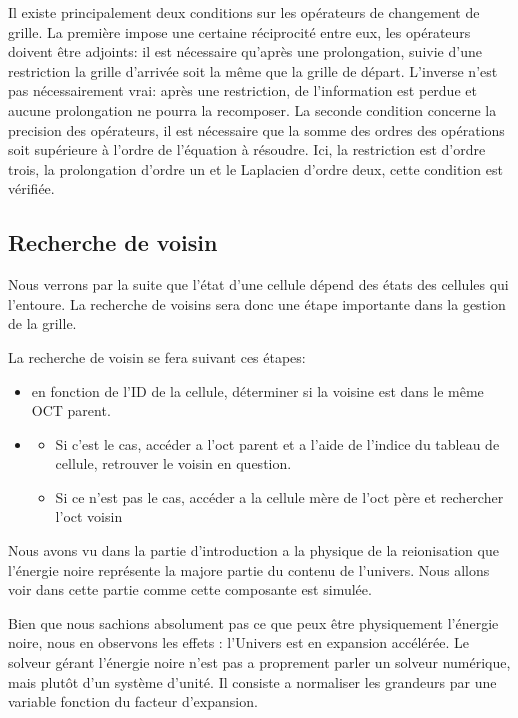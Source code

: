 Il existe principalement deux conditions sur les opérateurs de changement de grille. 
La première impose une certaine réciprocité entre eux, les opérateurs doivent être adjoints: il est nécessaire qu'après une prolongation, suivie d'une restriction la grille d'arrivée soit la même que la grille de départ. 
L'inverse n'est pas nécessairement vrai: après une restriction, de l'information est perdue et aucune prolongation ne pourra la recomposer.
La seconde condition concerne la precision des opérateurs, il est nécessaire que la somme des ordres des opérations soit supérieure à l'ordre de l'équation à résoudre. 
Ici, la restriction est d'ordre trois, la prolongation d'ordre un et le Laplacien d'ordre deux, cette condition est vérifiée.


\subsection{Recherche de voisin}
Nous verrons par la suite que l'état d'une cellule dépend des états des cellules qui l'entoure.
La recherche de voisins sera donc une étape importante dans la gestion de la grille.

La recherche de voisin se fera suivant ces étapes:

\begin{itemize}
\item en fonction de l'ID de la cellule, déterminer si la voisine est dans le même OCT parent.


\item
\begin{itemize}
\item Si c'est le cas, accéder a l'oct parent et a l'aide de l'indice du tableau de cellule, retrouver le voisin en question.
\item Si ce n'est pas le cas, accéder a la cellule mère de l'oct père et rechercher l'oct voisin
\end{itemize}

\end{itemize}


Nous avons vu dans la partie d'introduction a la physique de la reionisation que l'énergie noire représente la majore partie du contenu de l'univers.
Nous allons voir dans cette partie comme cette composante est simulée.

Bien que nous sachions absolument pas ce que peux être physiquement l'énergie noire, nous en observons les effets : l'Univers est en expansion accélérée.
Le solveur gérant l'énergie noire n'est pas a proprement parler un solveur numérique, mais plutôt d'un système d'unité. %
Il consiste a normaliser les grandeurs par une variable fonction du facteur d'expansion.

